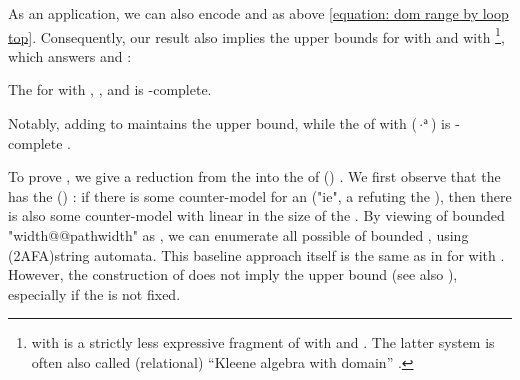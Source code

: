 \documentclass[10pt,a4paper]{article}
\theoremstyle{definition}
\theoremstyle{remark}
\newcommand{\bl}{\cdot}
\begin{document}
\begin{scope}
As an application,
we can also encode  and  as above \eqref{equation: dom range by loop top}.
Consequently, our result also implies the  upper bounds for 
 with  and  with  \cite{desharnaisInternalAxiomsDomain2011,mcleanFreeKleeneAlgebras2020,sedlarKleeneAlgebraDynamic2023}\footnote{
 with  is a strictly less expressive fragment of  with  and .
The latter system is often also called (relational) ``Kleene algebra with domain'' \cite{desharnaisKleeneAlgebraDomain2006}.},
%
which answers \cite[Problem 7.3]{mcleanFreeKleeneAlgebras2020} and \cite[p.\ 16]{sedlarKleeneAlgebraDynamic2023}:
\begin{cor}\label{corollary: KA with domain PSPACE-complete}
The 
for  with , , and  is \textup{}-complete.
\end{cor}
Notably, adding  to  maintains the  upper bound,
while the  of  with  ($\bl^{\mathsf{a}}$) is -complete \cite{sedlarComplexityKleeneAlgebra2023}.

To prove ,
we give a reduction from the  into the  of  () \cite{geffertTransformingTwoWayAlternating2014}.
We first observe that the  has the \emph{} () \cite[Proposition 2.9]{nakamuraDerivativesGraphsPositive2025}:
if there is some counter-model for an  ("ie", a  refuting the ),
then there is also some counter-model with  linear in the size of the .
By viewing  of bounded "width@@pathwidth" as ,
we can enumerate all possible  of bounded , using \kl(2AFA){string automata}.
This baseline approach itself is the same as in \cite{nakamuraDerivativesGraphsPositive2025} for  with .
However,
the construction of \cite{nakamuraDerivativesGraphsPositive2025} does not imply the  upper bound (see also \cite[p.~46--47]{nakamuraDerivativesGraphsPositive2025}), especially if the  is not fixed.


\end{scope}
\end{document}
